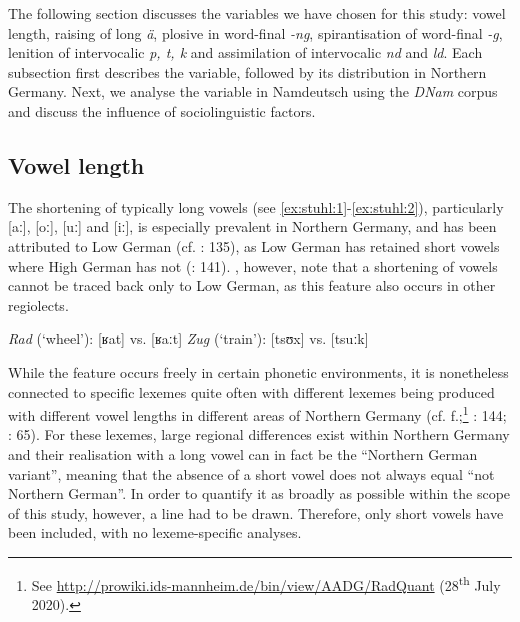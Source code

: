 \documentclass[output=paper]{langsci/langscibook}
\begin{document}
The following section discusses the variables we have chosen for this study: vowel length, raising of long \textit{ä}, plosive in word-final \textit{-ng}, spirantisation of word-final \textit{-g}, lenition of intervocalic \textit{p, t, k} and assimilation of intervocalic \textit{nd} and \textit{ld}. Each subsection first describes the variable, followed by its distribution in Northern Germany. Next, we analyse the variable in Namdeutsch using the \textit{DNam} corpus and discuss the influence of sociolinguistic factors.

\label{sec:stuhl:4}
\subsection{Vowel length}
\label{sec:stuhl:4.1}

The shortening of typically long vowels (see \ref{ex:stuhl:1}-\ref{ex:stuhl:2}), particularly [aː], [oː], [uː] and [iː], is especially prevalent in Northern Germany, and has been attributed to Low German (cf. \citealt{martens_niederdeutsch-bedingte_1988}: 135), as Low German has retained short vowels where High German has not (\citealt{elmentaler_norddeutscher_2015}: 141). \citet[141]{elmentaler_norddeutscher_2015}, however, note that a shortening of vowels cannot be traced back only to Low German, as this feature also occurs in other regiolects.

\ea\label{ex:stuhl:1}
\textit{Rad} (‘wheel’): {[ʁat]} vs. {[ʁaːt]} 
\ex\label{ex:stuhl:2}
\textit{Zug} (‘train’): {[tsʊx]} vs. {[tsuːk]} 
\z
 
 

While the feature occurs freely in certain phonetic environments, it is nonetheless connected to specific lexemes quite often with different lexemes being produced with different vowel lengths in different areas of Northern Germany (cf. \citealt{kleiner_atlas_2011}f.;\footnote{See \url{http://prowiki.ids-mannheim.de/bin/view/AADG/RadQuant} (28\textsuperscript{th} July 2020).} \citealt{elmentaler_norddeutscher_2015}: 144; \citealt{kleiner_duden_2015}: 65). For these lexemes, large regional differences exist within Northern Germany and their realisation with a long vowel can in fact be the “Northern German variant”, meaning that the absence of a short vowel does not always equal “not Northern German”. In order to quantify it as broadly as possible within the scope of this study, however, a line had to be drawn. Therefore, only short vowels have been included, with no lexeme-specific analyses.
\end{document}
